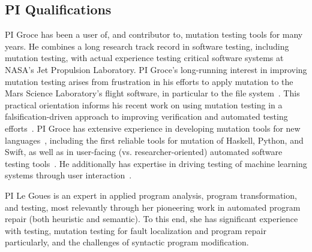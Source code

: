 \subsection{PI Qualifications}

PI Groce has been a user of, and contributor to, mutation testing tools for many years.  He combines a long research track record in software testing, including mutation testing, with actual experience testing critical software systems at NASA's Jet Propulsion Laboratory.  PI Groce's long-running interest in improving mutation testing arises from frustration in his efforts to apply mutation to the  Mars Science Laboratory's flight software, in particular to the file system~\cite{ICSEDiff,CFV08,AMAI}.  This practical orientation informs his recent work on using mutation testing in a falsification-driven approach to improving verification and automated testing efforts~\cite{groce2015verified,groce2018verified,mutKernel}.  PI Groce has extensive experience in developing mutation tools for new languages~\cite{le2014mucheck,muupi,regexpMut}, including the first reliable tools for mutation of Haskell, Python, and Swift, as well as in user-facing (vs. researcher-oriented) automated software testing tools~\cite{tstlsttt,DeepState}.  He additionally has expertise in driving testing of machine learning systems through user interaction~\cite{EndUserMistake,OnlyOracle}.

PI Le Goues is an expert in applied program analysis, program transformation,
and testing, most relevantly through her pioneering work in automated program
repair (both heuristic and semantic).  To this end, she has significant
experience with testing, mutation testing for fault localization and program
repair particularly, and the challenges of syntactic program modification. 
